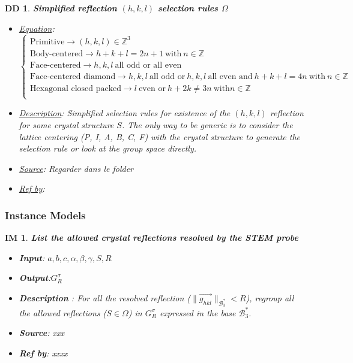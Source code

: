 \documentclass[12pt]{article}
\newcommand\norm[1]{\lVert#1\rVert}
\newtheorem{DD}{DD}
\newtheorem{IM}{IM}
\begin{document}
\begin{DD}
\label{DD_4}
\noindent\colorbox{shadecolorDD}{\normalfont \textbf{Simplified reflection $(h,k,l)$ selection rules $\Omega$ }}
\normalfont
\begin{itemize}
\item \underline{Equation}:  $
\begin{cases}
\text{Primitive} \rightarrow (h,k,l) \in \mathbb{Z}^{3} \\
\text{Body-centered} \rightarrow h+k+l=2n+1 \ \text{with} \ n \in \mathbb{Z} \\
\text{Face-centered} \rightarrow h,k,l \  \text{all odd or all even} \\
\text{Face-centered diamond} \rightarrow h,k,l \ \text{all odd or} \  h,k,l \ \text{all even and} \ h+k+l=4n \ \text{with} \ n \in \mathbb{Z} \\
\text{Hexagonal closed packed} \rightarrow l  \ \text{even  or} \  h+2k\neq 3n \ \text{with} n \in \mathbb{Z}\\
\end{cases}$
\item \underline{Description}: Simplified selection rules for existence of the $(h,k,l)$ reflection for some crystal structure $S$. The only way to be generic is to consider the lattice centering (P, I, A, B, C, F) with the crystal structure to generate the selection rule or look at the group space directly.
\item \underline{Source}: Regarder dans le folder
\item \underline{Ref by}: 
\end{itemize}
\end{DD}

\subsubsection{Instance Models} \label{sec_instance}    

\renewcommand{\labelitemi}{$-$}

\begin{IM}
\label{IM_1}
\noindent\colorbox{shadecolorIM}{\normalfont \textbf{List the allowed crystal reflections resolved by the STEM probe}}
\normalfont
\begin{itemize}
\item \textbf{Input}: $a, b, c, \alpha, \beta, \gamma, S, R$
\item \textbf{Output}:$G^{\sigma}_{R}$
\item \textbf{Description} : For all the resolved reflection ($\norm{\overrightarrow{g_{hkl}}}_{\mathcal{B}_{3}^{*}} < R$), regroup all the allowed reflections ($S \in \Omega$) in $G^{\sigma}_{R}$ expressed in the base $\mathcal{B}_{3}^{*}$.
\item \textbf{Source}: xxx
\item \textbf{Ref by}: xxxx
\end{itemize}
\end{IM}
\end{document}
